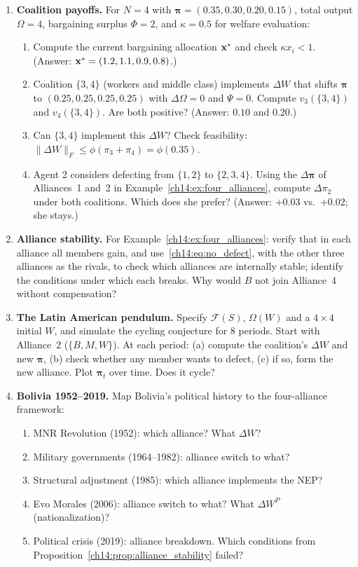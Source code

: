 \documentclass[../structural_economics_book.tex]{subfiles}
\begin{document}
\begin{enumerate}[label=\textbf{14.\arabic*}, leftmargin=3em]

\item \textbf{Coalition payoffs.} For $N = 4$ with $\boldsymbol{\pi} = (0.35, 0.30, 0.20, 0.15)$, total output $\Omega = 4$, bargaining surplus $\Phi = 2$, and $\kappa = 0.5$ for welfare evaluation:
\begin{enumerate}
\item Compute the current bargaining allocation $\mathbf{x}^*$ and check $\kappa x_i < 1$. (Answer: $\mathbf{x}^* = (1.2, 1.1, 0.9, 0.8)$.)
\item Coalition $\{3, 4\}$ (workers and middle class) implements $\Delta W$ that shifts $\boldsymbol{\pi}$ to $(0.25, 0.25, 0.25, 0.25)$ with $\Delta\Omega = 0$ and $\Psi = 0$. Compute $v_3(\{3,4\})$ and $v_4(\{3,4\})$. Are both positive? (Answer: $0.10$ and $0.20$.)
\item Can $\{3, 4\}$ implement this $\Delta W$? Check feasibility: $\|\Delta W\|_F \leq \phi(\pi_3 + \pi_4) = \phi(0.35)$.
\item Agent 2 considers defecting from $\{1, 2\}$ to $\{2, 3, 4\}$. Using the $\Delta\boldsymbol{\pi}$ of Alliances~1 and~2 in Example~\ref{ch14:ex:four_alliances}, compute $\Delta\pi_2$ under both coalitions. Which does she prefer? (Answer: $+0.03$ vs.\ $+0.02$; she stays.)
\end{enumerate}

\item \textbf{Alliance stability.} For Example~\ref{ch14:ex:four_alliances}: verify that in each alliance all members gain, and use~\eqref{ch14:eq:no_defect}, with the other three alliances as the rivals, to check which alliances are internally stable; identify the conditions under which each breaks. Why would $B$ not join Alliance~4 without compensation?

\item \textbf{The Latin American pendulum.}\label{ch14:ex:pendulum} Specify $\mathcal{F}(S)$, $\Omega(W)$ and a $4\times 4$ initial $W$, and simulate the cycling conjecture for 8 periods. Start with Alliance~2 ($\{B,M,W\}$). At each period: (a) compute the coalition's $\Delta W$ and new $\boldsymbol{\pi}$, (b) check whether any member wants to defect, (c) if so, form the new alliance. Plot $\boldsymbol{\pi}_t$ over time. Does it cycle?

\item \textbf{Bolivia 1952--2019.} Map Bolivia's political history to the four-alliance framework:
\begin{enumerate}
\item MNR Revolution (1952): which alliance? What $\Delta W$?
\item Military governments (1964--1982): alliance switch to what?
\item Structural adjustment (1985): which alliance implements the NEP?
\item Evo Morales (2006): alliance switch to what? What $\Delta W^P$ (nationalization)?
\item Political crisis (2019): alliance breakdown. Which conditions from Proposition~\ref{ch14:prop:alliance_stability} failed?
\end{enumerate}


\end{enumerate}
\end{document}
